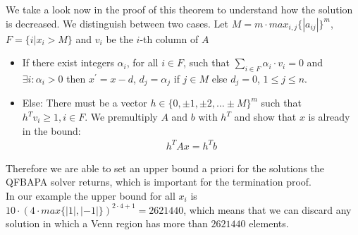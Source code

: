 \documentclass{book}
\theoremstyle{break}
\theoremstyle{definition}
\begin{document}
We take a look now in the proof of this theorem to understand how the solution is decreased. We distinguish between two cases. Let $M=m\cdot max_{i,j}\{|a_{ij}|\}^m$, $F=\{i|x_i>M\}$ and $v_i$ be the $i$-th column of $A$
\begin{itemize}
\item If there exist integers $\alpha_i$, for all $i\in F$, such that $\sum_{i\in F}\alpha_i\cdot v_i=0$ and $\exists i: \alpha_i>0$ then $x^\prime=x-d$, $d_j=\alpha_j$ if $j\in M$ else $d_j=0$, $1\leq j\leq n$.
\item Else: There must be a vector $h\in\{0,\pm 1,\pm 2,\dots \pm M\}^m$ such that $h^T v_i\geq1, i\in F$. We premultiply $A$ and $b$ with $h^T$ and show that $x$ is already in the bound:
\begin{align*}
h^TA x = h^Tb
\end{align*}
\end{itemize}
Therefore we are able to set an upper bound a priori for the solutions the QFBAPA solver returns, which is important for the termination proof.\\
In our example the upper bound for all $x_i$ is $10\cdot (4\cdot max\{|1|,|-1|\})^{2\cdot 4+1}=2621440$, which means that we can discard any solution in which a Venn region has more than $2621440$ elements.
\end{document}
